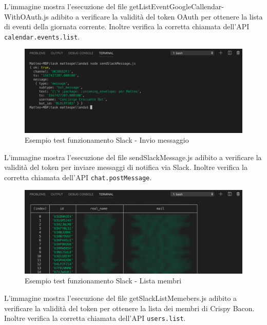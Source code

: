 \newpage
\noindent L'immagine mostra l'esecuzione del file getListEventGoogleCallendar-WithOAuth.js adibito a verificare la validità del token OAuth per ottenere la lista di eventi della giornata corrente. Inoltre verifica la corretta chiamata dell'API \texttt{calendar.events.list}.
\begin{figure}[H]
	\includegraphics[width=13cm]{immagini/test-sendSlack.png}
	\caption{\label{fig:test_slack_send}Esempio test funzionamento Slack - Invio messaggio}
\end{figure}
\noindent L'immagine mostra l'esecuzione del file sendSlackMessage.js adibito a verificare la validità del token per inviare messaggi di notifica via Slack. Inoltre verifica la corretta chiamata dell'API \texttt{chat.postMessage}.
\begin{figure}[H]
	\includegraphics[width=13cm]{immagini/test-listSlack.png}
	\caption{\label{fig:test_slack_list}Esempio test funzionamento Slack - Lista membri}
\end{figure}
\noindent L'immagine mostra l'esecuzione del file getSlackListMemebers.js adibito a verificare la validità del token per ottenere la lista dei membri di Crispy Bacon. Inoltre verifica la corretta chiamata dell'API \texttt{users.list}.


